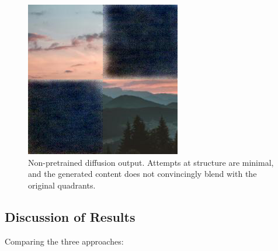 \documentclass[sigconf]{acmart}
\begin{document}
\begin{figure}[h!]
    \centering
    \includegraphics[width=\linewidth]{diffusion_step_2_5}
    \caption{Non-pretrained diffusion output. Attempts at structure are minimal, and the generated content does not convincingly blend with the original quadrants.}
    \label{fig:diffusion_step_2_5}
\end{figure}

\subsection*{Discussion of Results}

Comparing the three approaches:
\end{document}

